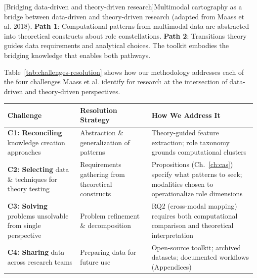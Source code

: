 \documentclass[../main.tex]{subfiles}
\begin{document}
\begin{center}
[Bridging data-driven and theory-driven research]{Multimodal cartography as a bridge between data-driven and theory-driven research (adapted from Maass et al. 2018). \textbf{Path 1}: Computational patterns from multimodal data are abstracted into theoretical constructs about role constellations. \textbf{Path 2}: Transitions theory guides data requirements and analytical choices. The \RoleBox{} toolkit embodies the bridging knowledge that enables both pathways.}
\label{fig:bridging-framework}
\end{center}

Table~\ref{tab:challenges-resolution} shows how our methodology addresses each of the four challenges Maass et al. identify for research at the intersection of data-driven and theory-driven perspectives.

\begin{center}
\small
\begin{tabular}{@{}p{3.2cm}p{3.8cm}p{4cm}@{}}
\toprule
\textbf{Challenge} & \textbf{Resolution Strategy} & \textbf{How We Address It} \\
\midrule
\textbf{C1: Reconciling} knowledge creation approaches & Abstraction \& generalization of patterns & Theory-guided feature extraction; role taxonomy grounds computational clusters \\
\addlinespace
\textbf{C2: Selecting} data \& techniques for theory testing & Requirements gathering from theoretical constructs & Propositions (Ch.~\ref{ch:cas}) specify what patterns to seek; modalities chosen to operationalize role dimensions \\
\addlinespace
\textbf{C3: Solving} problems unsolvable from single perspective & Problem refinement \& decomposition & RQ2 (cross-modal mapping) requires both computational comparison and theoretical interpretation \\
\addlinespace
\textbf{C4: Sharing} data across research teams & Preparing data for future use & Open-source toolkit; archived datasets; documented workflows (Appendices) \\
\bottomrule
\end{tabular}
\label{tab:challenges-resolution}
\end{center}
\end{document}

